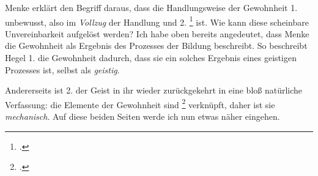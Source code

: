 \documentclass[12pt, a4paper, openany]{report}
\begin{document}
Menke erklärt den Begriff  daraus, dass die Handlungsweise der Gewohnheit 1. unbewusst, also im \emph{Vollzug} der Handlung  und 2.  \footcite[][128]{menke_autonomie_2018} ist.
Wie kann diese scheinbare Unvereinbarkeit aufgelöst werden?
Ich habe oben bereits angedeutet, dass Menke die Gewohnheit als Ergebnis des Prozesses der Bildung beschreibt.
So beschreibt Hegel 1. die Gewohnheit dadurch, dass sie ein solches Ergebnis eines geistigen Prozesses ist, selbst als \emph{geistig}. 
\begin{comment}
Dem füge ich noch hinzu, dass sie nicht nur auf Grund des geistigen Prozesses, der Einwohnung, sondern eben dadurch geistig ist, dass der Prozess selbst aus Gründen angeeignet wurde, so beschreibt Menke, die Teilnahme an der sozialen Praxis, als eine Teilnahme \emph{aus Gründen}.
Menke beschreibt den Prozess der Bildung, als die \qq{>>Einwohnung<< eines künstlichen Zwecks}\footcite[][129]{menke_autonomie_2018}.
\end{comment}
Andererseits ist 2. der Geist in ihr wieder zurückgekehrt in eine bloß natürliche Verfassung: 
die Elemente der Gewohnheit sind \footcite[][129]{menke_autonomie_2018} verknüpft, daher ist sie \emph{mechanisch}.
Auf diese beiden Seiten werde ich nun etwas näher eingehen.\\
\end{document}
